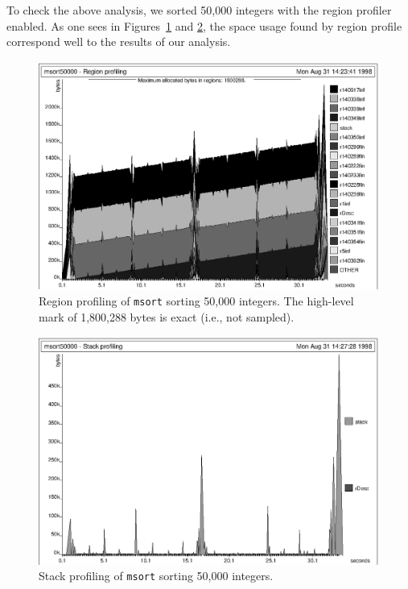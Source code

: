 \documentclass[12pt]{book}
\begin{document}
To check the above analysis, we sorted 50,000 integers with the region
profiler enabled.  As one sees in Figures~\ref{msortregion.fig}
and \ref{msortstack.fig}, the space
usage found by region profile correspond well to the results
of our analysis. 
\begin{figure}%
\begin{center}
\includegraphics{msortregion.ps}
\end{center}
\caption{Region profiling of {\tt msort} sorting 50,000
integers. The high-level mark of 1,800,288 bytes is exact (i.e., not sampled).}
\label{msortregion.fig}
\end{figure}

\begin{figure}%
\begin{center}
\includegraphics{msortstack.ps}
\end{center}
\caption{Stack profiling of {\tt msort} sorting 50,000
integers.}
\label{msortstack.fig}
\end{figure}
\end{document}
